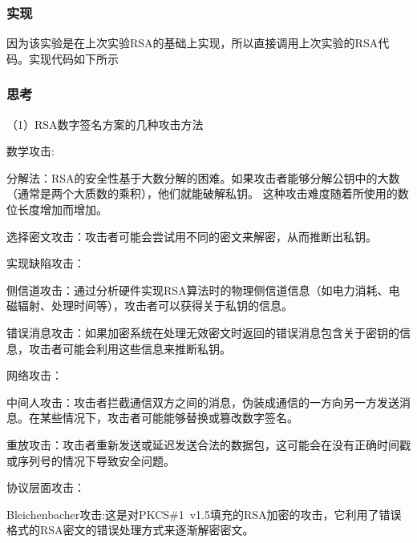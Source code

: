 \documentclass[a4paper,11pt,UTF8]{ctexart}
\begin{document}
        \subsubsection{实现}
            因为该实验是在上次实验RSA的基础上实现，所以直接调用上次实验的RSA代码。实现代码如下所示
            

        \subsubsection{思考}
            （1）RSA数字签名方案的几种攻击方法\par
                数学攻击:\par
                    分解法：RSA的安全性基于大数分解的困难。如果攻击者能够分解公钥中的大数（通常是两个大质数的乘积），他们就能破解私钥。
                    这种攻击难度随着所使用的数位长度增加而增加。\par
                    选择密文攻击：攻击者可能会尝试用不同的密文来解密，从而推断出私钥。\par
                实现缺陷攻击：\par
                    侧信道攻击：通过分析硬件实现RSA算法时的物理侧信道信息（如电力消耗、电磁辐射、处理时间等），攻击者可以获得关于私钥的信息。\par
                    错误消息攻击：如果加密系统在处理无效密文时返回的错误消息包含关于密钥的信息，攻击者可能会利用这些信息来推断私钥。\par
                网络攻击：\par
                    中间人攻击：攻击者拦截通信双方之间的消息，伪装成通信的一方向另一方发送消息。在某些情况下，攻击者可能能够替换或篡改数字签名。\par
                    重放攻击：攻击者重新发送或延迟发送合法的数据包，这可能会在没有正确时间戳或序列号的情况下导致安全问题。\par
                协议层面攻击：\par
                    Bleichenbacher攻击:这是对PKCS\#1\ v1.5填充的RSA加密的攻击，它利用了错误格式的RSA密文的错误处理方式来逐渐解密密文。\par
\end{document}
